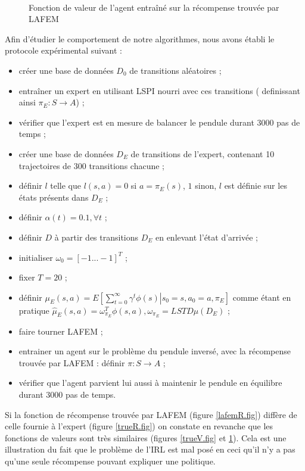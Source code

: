 \documentclass[publibook-draft]{CAp2012}
\begin{document}
{\begin{figure}
\begin{minipage}[t]{.4\linewidth}
\begin{center}
       \caption{Fonction de valeur de l'agent entraîné sur la récompense trouvée par LAFEM}
       \label{lafemV.fig}
    \end{center}
\end{minipage}\\
\end{figure}
Afin d'étudier le comportement de notre algorithmes, nous avons établi le protocole expérimental suivant :
\begin{itemize}
 \item créer une base de données $D_0$ de transitions aléatoires ;
 \item entraîner un expert en utilisant LSPI nourri avec ces transitions ( definissant ainsi $\pi_E : S\rightarrow A$) ;
 \item vérifier que l'expert est en mesure de balancer le pendule durant 3000 pas de temps ;
 \item créer une base de données $D_E$ de transitions de l'expert, contenant 10 trajectoires de 300 transitions chacune ;
 \item définir $l$ telle que $l(s,a) = 0$ si $a=\pi_E(s)$, $1$ sinon, $l$ est définie sur les états présents dans $D_E$ ;
 \item définir $\alpha(t) = 0.1,\forall t$ ;
 \item définir $D$ à partir des transitions $D_E$ en enlevant l'état d'arrivée ;
 \item initialiser $\omega_0 = [-1...-1]^T$ ;
 \item fixer $T=20$ ;
 \item définir $\mu_E(s,a) = E\left.\left[\sum\limits_{t=0}^\infty \gamma^t \phi(s)\right|s_0 = s, a_0 = a, \pi_E\right]$ comme étant en pratique $\hat\mu_E(s,a) =  \omega^T_{\pi_E}\phi(s,a), \omega_{\pi_E} = LSTD\mu(D_E)$ ;
 \item faire tourner LAFEM ;
 \item entrainer un agent sur le problème du pendule inversé, avec la récompense trouvée par LAFEM : définir $\pi : S\rightarrow A$ ;
 \item vérifier que l'agent parvient lui aussi à maintenir le pendule en équilibre durant 3000 pas de temps.
\end{itemize}

Si la fonction de récompense trouvée par LAFEM (figure \ref{lafemR.fig}) diffère de celle fournie à l'expert (figure \ref{trueR.fig}) on constate en revanche que les fonctions de valeurs sont très similaires (figures \ref{trueV.fig} et \ref{lafemV.fig}). Cela est une illustration du fait que le problème de l'IRL est mal posé en ceci qu'il n'y a pas qu'une seule récompense pouvant expliquer une politique.\\

}
\end{document}
